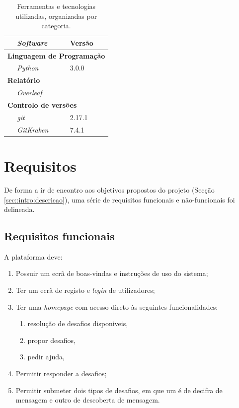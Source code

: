 \begin{table}[!htbp]
	\centering
	\begin{tabular}{p{1cm} l l}
		\toprule
		& {\itshape\bfseries Software} & {\bfseries Versão} \\
		\midrule
		\multicolumn{3}{l}{\bfseries Linguagem de Programação} \\
		& \textit{Python} & 3.0.0 \\
        \midrule
		\multicolumn{3}{l}{\bfseries Relatório} \\
		& \textit{Overleaf} & \\
		\midrule
		\multicolumn{3}{l}{\bfseries Controlo de versões} \\
		& \textit{git} & 2.17.1 \\
		& \textit{GitKraken} & 7.4.1  \\
		\bottomrule
	\end{tabular}
	\caption[Ferramentas utilizadas]{Ferramentas e tecnologias utilizadas, organizadas por categoria.}
	\label{tab::ferramentas}
\end{table}



\section{Requisitos}
\label{sec::engsoft:requisitos}

De forma a ir de encontro aos objetivos propostos do projeto (Secção \ref{sec::intro:descricao}), uma série de requisitos funcionais e não-funcionais foi delineada.

\subsection{Requisitos funcionais}
\label{ssec::engsoft:requisitos:funcionais}

A plataforma deve:

\begin{enumerate}
	\item Possuir um ecrã de boas-vindas e instruções de uso do sistema;
	\item Ter um ecrã de registo e \emph{login} de utilizadores;
	\item Ter uma \textit{homepage} com acesso direto às seguintes funcionalidades:
	\begin{enumerate}
		\item resolução de desafios disponiveis,
		\item propor desafios,
		\item pedir ajuda,
	\end{enumerate}
	\item Permitir responder a desafios;
	\item Permitir submeter dois tipos de desafios, em que um é de decifra de mensagem e outro de descoberta de mensagem.
\end{enumerate}



